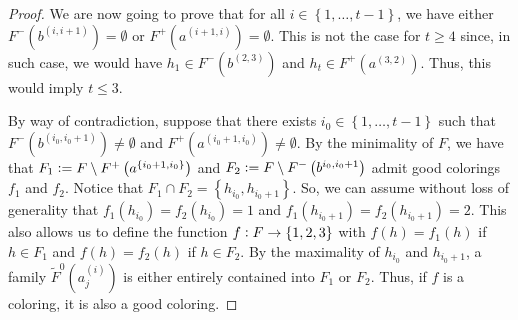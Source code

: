 \documentclass[12pt]{article}
\theoremstyle{definition}
\newcommand{\defeq}{\vcentcolon=}
\begin{document}
\begin{proof}
         We are now going to prove that
         for all $i \in \left\{1, \ldots, t -1\right\}$,
         we have either $F^{-}\left(b^{\left(i, i+1\right)}\right)
         = \emptyset$ or 
         $F^{+}\left(a^{\left(i+1, i\right)}\right)
         = \emptyset$. This is
         not the case for $t \geq 4$ since,
         in such case, we would have 
         $h_1 \in F^{-}\left(b^{\left(2, 3\right)}\right)$
         and $h_{t} \in F^{+}\left(a^{\left(3, 2\right)}\right)$.
         Thus, this would imply $t \leq 3$.

         By way of contradiction,
         suppose that there exists
         $i_0 \in \left\{1, \ldots, t-1\right\}$
         such that $F^{-}\left(b^{\left(i_0, i_0+1\right)}\right)
         \neq \emptyset$ and
         $F^{+}\left(a^{\left(i_0+1, i_0\right)}\right)
         \neq \emptyset$.
         By the minimality of $F$, 
         we have that
         $F_1 \defeq F \setminus F^{+}
         \left(a^{\left\{i_0+1, i_0\right\}}\right)$
         and
         $F_2 \defeq F \setminus F^{-}
         \left(b^{i_0,i_0+1}\right)$ 
         admit good colorings
         $f_1$ and $f_2$.
         Notice that $F_1 \cap F_2 = 
         \left\{h_{i_0}, h_{i_0+1}\right\}$.
         So, we can assume without loss
         of generality that
         $f_1\left(h_{i_0}\right) = 
         f_2\left(h_{i_0}\right) = 1$ 
         and $f_1\left(h_{i_0+1}\right) =
         f_2\left(h_{i_0+1}\right) =2$.
         This also allows us to define 
         the function $f \vcentcolon 
         F \rightarrow \left\{1, 2, 3\right\}$ 
         with $f\left(h\right) = f_1\left(h\right)$ 
         if $h \in F_1$ and 
         $f\left(h\right) = f_2\left(h\right)$ 
         if $h \in F_2$.
         By the maximality
         of $h_{i_0}$ and $h_{i_0+1}$,
         a family
         $\widetilde{F}^{0}\left(a_{j}^{\left(i\right)}\right)$
         is either entirely contained
         into $F_1$ or $F_2$.
         Thus, if $f$ is a coloring,
         it is also a good coloring.


\end{proof}
\end{document}
